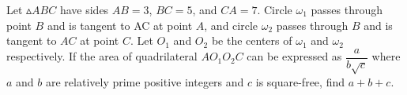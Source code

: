 Let $\vartriangle ABC$ have sides $AB = 3$, $BC = 5$, and $CA = 7$. Circle $\omega_1$ passes through point $B$ and is tangent to AC at point $A$, and circle $\omega_2$ passes through $B$ and is tangent to $AC$ at point $C$. Let $O_1$ and $O_2$ be the centers of $\omega_1$ and $\omega_2$ respectively. If the area of quadrilateral $AO_1O_2C$ can be expressed as $\dfrac{a}{b\sqrt{c}}$ where $a$ and $b$ are relatively prime positive integers and $c$ is square-free, find $a + b + c$.

